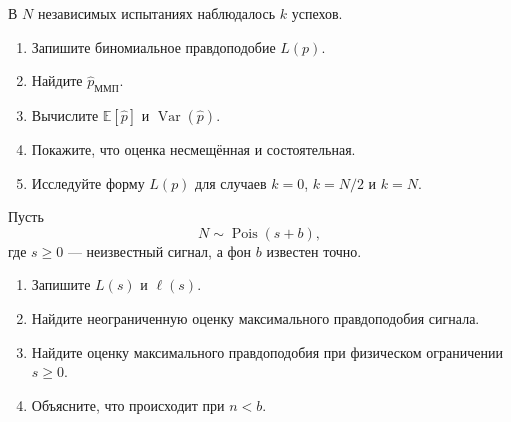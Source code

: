 \documentclass[
  russian,
  11pt,
  a4paper,
  open=any]{scrbook}
\providecommand{\tightlist}{%
  \setlength{\itemsep}{0pt}\setlength{\parskip}{0pt}}
\begin{document}
\begin{semanticpdfbox}[colback=BookCoralSoft,borderline west={1.2mm}{0pt}{BookCoral}]

\par\nopagebreak[4]\vspace{1.2mm}

В \(N\) независимых испытаниях наблюдалось \(k\) успехов.

\begin{enumerate}
\def\labelenumi{\arabic{enumi}.}
\tightlist
\item
  Запишите биномиальное правдоподобие \(L(p)\).
\item
  Найдите \(\widehat p_{\mathrm{ММП}}\).
\item
  Вычислите \(\mathbb E[\widehat p]\) и
  \(\operatorname{Var}(\widehat p)\).
\item
  Покажите, что оценка несмещённая и состоятельная.
\item
  Исследуйте форму \(L(p)\) для случаев \(k=0\), \(k=N/2\) и \(k=N\).
\end{enumerate}

\end{semanticpdfbox}

\begin{semanticpdfbox}[colback=BookCoralSoft,borderline west={1.2mm}{0pt}{BookCoral}]

\par\nopagebreak[4]\vspace{1.2mm}

Пусть \[
N\sim\operatorname{Pois}(s+b),
\] где \(s\ge0\) --- неизвестный сигнал, а фон \(b\) известен точно.

\begin{enumerate}
\def\labelenumi{\arabic{enumi}.}
\tightlist
\item
  Запишите \(L(s)\) и \(\ell(s)\).
\item
  Найдите неограниченную оценку максимального правдоподобия сигнала.
\item
  Найдите оценку максимального правдоподобия при физическом ограничении
  \(s\ge0\).
\item
  Объясните, что происходит при \(n<b\).
\end{enumerate}

\end{semanticpdfbox}
\end{document}
